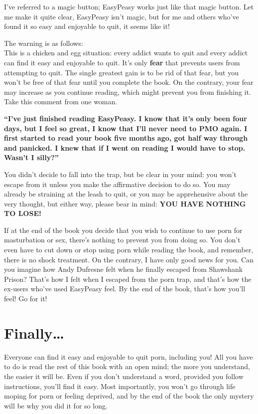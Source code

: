 \documentclass[
]{book}
\begin{document}
I've referred to a magic button; EasyPeasy works just like that magic button. Let me make it quite clear, EasyPeasy isn't magic, but for me and others who've found it so easy and enjoyable to quit, it seems like it!

The warning is as follows:\\
This is a chicken and egg situation: every addict wants to quit and every addict can find it easy and enjoyable to quit. It's only \textbf{fear} that prevents users from attempting to quit. The single greatest gain is to be rid of that fear, but you won't be free of that fear until you complete the book. On the contrary, your fear may increase as you continue reading, which might prevent you from finishing it. Take this comment from one woman.

\textbf{``I've just finished reading EasyPeasy. I know that it's only been four days, but I feel so great, I know that I'll never need to PMO again. I first started to read your book five months ago, got half way through and panicked. I knew that if I went on reading I would have to stop. Wasn't I silly?''}

You didn't decide to fall into the trap, but be clear in your mind: you won't escape from it unless you make the affirmative decision to do so. You may already be straining at the leash to quit, or you may be apprehensive about the very thought, but either way, please bear in mind: \textbf{YOU HAVE NOTHING TO LOSE!}

If at the end of the book you decide that you wish to continue to use porn for masturbation or sex, there's nothing to prevent you from doing so. You don't even have to cut down or stop using porn while reading the book, and remember, there is no shock treatment. On the contrary, I have only good news for you. Can you imagine how Andy Dufresne felt when he finally escaped from Shawshank Prison? That's how I felt when I escaped from the porn trap, and that's how the ex-users who've used EasyPeasy feel. By the end of the book, that's how you'll feel! Go for it!

\hypertarget{finally}{%
\section*{Finally\ldots{}}\label{finally}}

Everyone can find it easy and enjoyable to quit porn, including you! All you have to do is read the rest of this book with an open mind; the more you understand, the easier it will be. Even if you don't understand a word, provided you follow instructions, you'll find it easy. Most importantly, you won't go through life moping for porn or feeling deprived, and by the end of the book the only mystery will be why you did it for so long.
\end{document}
